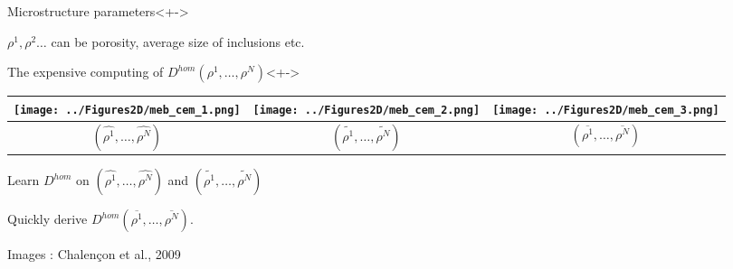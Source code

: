\begin{frame}%
%
\begin{block}{Microstructure parameters}<+->
%
\begin{multicols}{3}
$\rho^1, \rho^2 \dots$ can be porosity, average size of inclusions etc.

\columnbreak

{}

\columnbreak

{}
\end{multicols}
%
%
\end{block}
%
\begin{block}{The expensive computing of $D^{hom}(\rho^1,\dots ,\rho^N)$}<+->
%
\begin{tabular}{|c|c|c|}
\hline
\texttt{[image: ../Figures2D/meb\_cem\_1.png]}&%
\texttt{[image: ../Figures2D/meb\_cem\_2.png]}&%
\texttt{[image: ../Figures2D/meb\_cem\_3.png]}%
\\
\hline
$(\hat{\rho^1},\dots ,\hat{\rho^N})$&%
$(\tilde{\rho^1},\dots ,\tilde{\rho^N})$&%
$(\overline{\rho^1},\dots ,\overline{\rho^N})$%
\\
\hline
\end{tabular}

\begin{description}
\item<+-> [Training] Learn $D^{hom}$ on $(\hat{\rho^1},\dots ,\hat{\rho^N})$ and $(\tilde{\rho^1},\dots ,\tilde{\rho^N})$
\item<+-> [ROM] Quickly derive $D^{hom}(\overline{\rho^1},\dots ,\overline{\rho^N})$.
\end{description}
%
\par
Images : Chalen\c con et al., 2009
\end{block}
%
\end{frame}